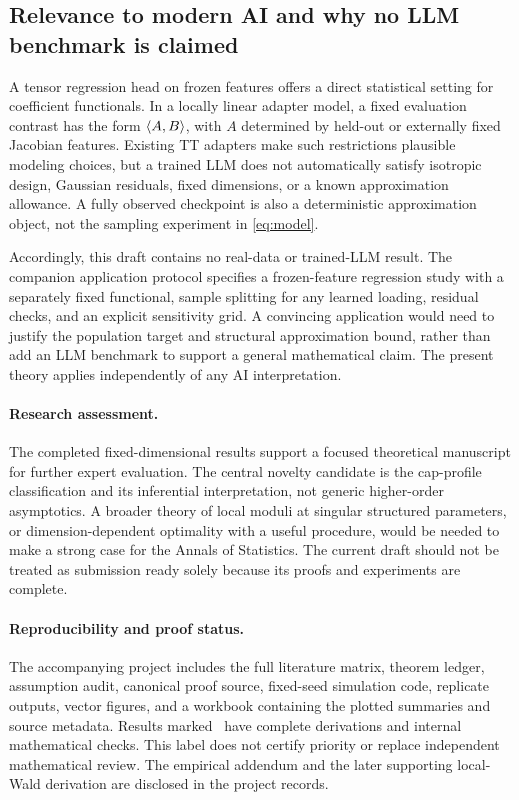 \subsection{Relevance to modern AI and why no LLM benchmark is claimed}
A tensor regression head on frozen features offers a direct statistical setting for coefficient functionals. In a locally linear adapter model, a fixed evaluation contrast has the form $\langle A,B\rangle$, with $A$ determined by held-out or externally fixed Jacobian features. Existing TT adapters make such restrictions plausible modeling choices, but a trained LLM does not automatically satisfy isotropic design, Gaussian residuals, fixed dimensions, or a known approximation allowance. A fully observed checkpoint is also a deterministic approximation object, not the sampling experiment in \eqref{eq:model}.

Accordingly, this draft contains no real-data or trained-LLM result. The companion application protocol specifies a frozen-feature regression study with a separately fixed functional, sample splitting for any learned loading, residual checks, and an explicit sensitivity grid. A convincing application would need to justify the population target and structural approximation bound, rather than add an LLM benchmark to support a general mathematical claim. The present theory applies independently of any AI interpretation.

\paragraph{Research assessment.}
The completed fixed-dimensional results support a focused theoretical manuscript for further expert evaluation. The central novelty candidate is the cap-profile classification and its inferential interpretation, not generic higher-order asymptotics. A broader theory of local moduli at singular structured parameters, or dimension-dependent optimality with a useful procedure, would be needed to make a strong case for the Annals of Statistics. The current draft should not be treated as submission ready solely because its proofs and experiments are complete.

\paragraph{Reproducibility and proof status.}
The accompanying project includes the full literature matrix, theorem ledger, assumption audit, canonical proof source, fixed-seed simulation code, replicate outputs, vector figures, and a workbook containing the plotted summaries and source metadata. Results marked \pr\ have complete derivations and internal mathematical checks. This label does not certify priority or replace independent mathematical review. The empirical addendum and the later supporting local-Wald derivation are disclosed in the project records.
